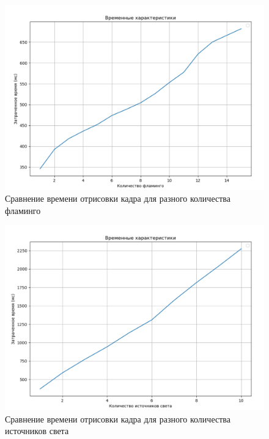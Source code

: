 \begin{figure}[h!]
	\centering
	\includegraphics[width=0.9\linewidth]{img/flams}
	\caption{Сравнение времени отрисовки кадра для разного количества фламинго}
	\label{fig:flams}
\end{figure}

\begin{figure}[h!]
	\centering
	\includegraphics[width=0.9\linewidth]{img/lights}
	\caption{Сравнение времени отрисовки кадра для разного количества источников света}
	\label{fig:lights}
\end{figure}